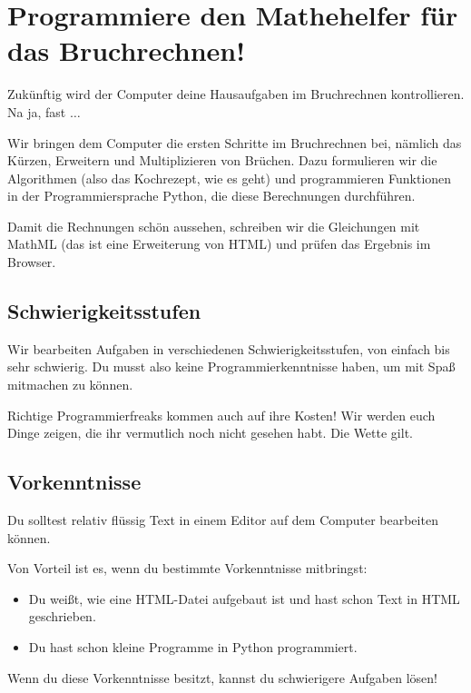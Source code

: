 \section{Programmiere den Mathehelfer für das Bruchrechnen!}

Zukünftig wird der Computer deine Hausaufgaben im Bruchrechnen kontrollieren. Na ja, fast $\dots$

Wir bringen dem Computer die ersten Schritte im Bruchrechnen bei, nämlich das Kürzen, Erweitern und Multiplizieren von Brüchen. Dazu formulieren wir die Algorithmen (also das Kochrezept, wie es geht) und programmieren Funktionen in der Programmiersprache Python, die diese Berechnungen durchführen.

Damit die Rechnungen schön aussehen, schreiben wir die Gleichungen mit MathML (das ist eine Erweiterung von HTML) und prüfen das Ergebnis im Browser.

\subsection{Schwierigkeitsstufen}

Wir bearbeiten Aufgaben in verschiedenen Schwierigkeitsstufen, von einfach bis sehr schwierig. Du musst also keine Programmierkenntnisse haben, um mit Spaß mitmachen zu können.

Richtige Programmierfreaks kommen auch auf ihre Kosten! Wir werden euch Dinge zeigen, die ihr vermutlich noch nicht gesehen habt. Die Wette gilt.

\subsection{Vorkenntnisse}

Du solltest relativ flüssig Text in einem Editor auf dem Computer bearbeiten können.

Von Vorteil ist es, wenn du bestimmte Vorkenntnisse mitbringst:
\begin{itemize}
	\item Du weißt, wie eine HTML-Datei aufgebaut ist und hast schon Text in HTML geschrieben.
	\item Du hast schon kleine Programme in Python programmiert.
\end{itemize}

Wenn du diese Vorkenntnisse besitzt, kannst du schwierigere Aufgaben lösen!

